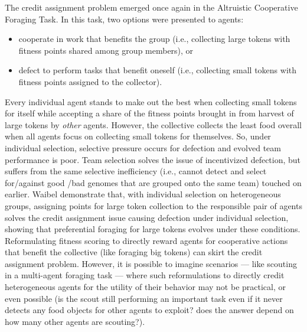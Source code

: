 The credit assignment problem emerged once again in the Altruistic Cooperative Foraging Task.
In this task, two options were presented to agents:
\begin{itemize}
\item cooperate in work that benefits the group (i.e., collecting large tokens with fitness points shared among group members), or
\item defect to perform tasks that benefit oneself (i.e., collecting small tokens with fitness points assigned to the collector).
\end{itemize}
Every individual agent stands to make out the best when collecting small tokens for itself while accepting a share of the fitness points brought in from harvest of large tokens by \textit{other} agents.
However, the collective collects the least food overall when all agents focus on collecting small tokens for themselves.
So, under individual selection, selective pressure occurs for defection and evolved team performance is poor.
Team selection solves the issue of incentivized defection, but suffers from the same selective inefficiency (i.e., cannot detect and select for/against good /bad genomes that are grouped onto the same team) touched on earlier.
Waibel demonstrate that, with individual selection on heterogeneous groups, assigning points for large token collection to the responsible pair of agents solves the credit assignment issue causing defection under individual selection, showing that preferential foraging for large tokens evolves under these conditions.
Reformulating fitness scoring to directly reward agents for cooperative actions that benefit the collective (like foraging big tokens) can skirt the credit assignment problem.
However, it is possible to imagine scenarios --- like scouting in a multi-agent foraging task --- where such reformulations to directly credit heterogeneous agents for the utility of their behavior may not be practical, or even possible (is the scout still performing an important task even if it never detects any food objects for other agents to exploit? does the answer depend on how many other agents are scouting?).
